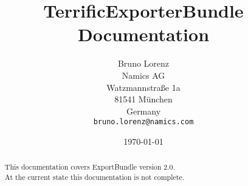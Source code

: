 \documentclass{article}
\title{TerrificExporterBundle Documentation}
\author{Bruno Lorenz\\
  Namics AG\\
  Watzmannstraße 1a\\
  81541 München\\
  Germany\\
  \texttt{bruno.lorenz@namics.com}}
\date{\today}
\begin{document}
\begin{abstract}
    \Large This documentation covers ExportBundle version 2.0.\\
    \Large At the current state this documentation is not complete.
\end{abstract}

\newpage
\tableofcontents










\end{document}
